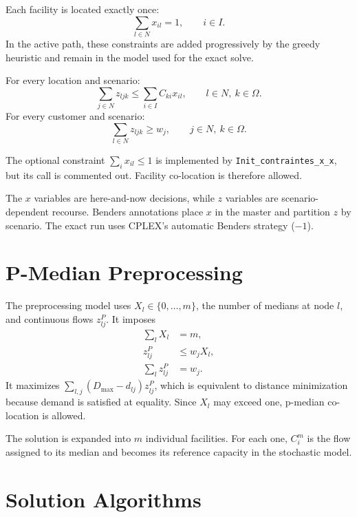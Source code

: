 \documentclass[11pt,a4paper]{article}
\newcommand{\code}[1]{\texttt{#1}}
\begin{document}
Each facility is located exactly once:
\begin{equation}
\sum_{l\in N}x_{il}=1,\qquad i\in I.
\label{eq:location}
\end{equation}
In the active path, these constraints are added progressively by the greedy
heuristic and remain in the model used for the exact solve.

For every location and scenario:
\begin{equation}
\sum_{j\in N}z_{ljk}\leq\sum_{i\in I}C_{ki}x_{il},
\qquad l\in N,\ k\in\Omega.
\end{equation}
For every customer and scenario:
\begin{equation}
\sum_{l\in N}z_{ljk}\geq w_j,
\qquad j\in N,\ k\in\Omega.
\end{equation}

The optional constraint $\sum_i x_{il}\leq1$ is implemented by
\code{Init\_contraintes\_x\_x}, but its call is commented out. Facility
co-location is therefore allowed.

The $x$ variables are here-and-now decisions, while $z$ variables are
scenario-dependent recourse. Benders annotations place $x$ in the master and
partition $z$ by scenario. The exact run uses CPLEX's automatic Benders
strategy ($-1$).

\section{P-Median Preprocessing}

The preprocessing model uses $X_l\in\{0,\ldots,m\}$, the number of medians at
node $l$, and continuous flows $z^P_{lj}$. It imposes
\begin{align}
\sum_lX_l&=m,\\
z^P_{lj}&\leq w_jX_l,\\
\sum_lz^P_{lj}&=w_j.
\end{align}
It maximizes $\sum_{l,j}(D_{\max}-d_{lj})z^P_{lj}$, which is equivalent to
distance minimization because demand is satisfied at equality. Since $X_l$
may exceed one, p-median co-location is allowed.

The solution is expanded into $m$ individual facilities. For each one,
$C_i^m$ is the flow assigned to its median and becomes its reference
capacity in the stochastic model.

\section{Solution Algorithms}
\end{document}
